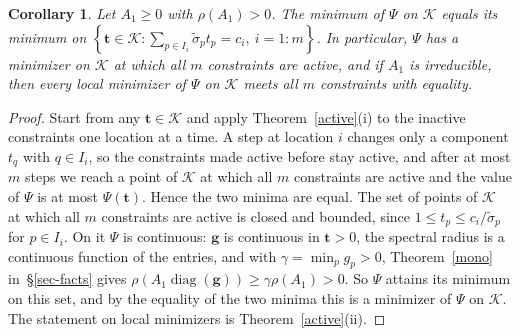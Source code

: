 \documentclass[11pt]{article}
\theoremstyle{plain}
\newtheorem{corollary}[theorem]{Corollary}
\theoremstyle{definition}
\theoremstyle{remark}
\numberwithin{equation}{section}
\numberwithin{figure}{section}
\numberwithin{table}{section}
\numberwithin{algorithm}{section}
\begin{document}
\begin{corollary}\label{all-active}
Let $A_1\ge 0$ with $\rho(A_1)>0$. The minimum of $\Psi$ on $\mathcal{K}$ equals its minimum on
$\left\{\bm t\in\mathcal{K}:\sum_{p\in I_i}\widetilde\sigma_pt_p=c_i,\ i=1:m\right\}$.
In particular, $\Psi$ has a minimizer on $\mathcal{K}$ at which all $m$
constraints are active, and if $A_1$ is irreducible, then every local minimizer of $\Psi$ on
$\mathcal{K}$ meets all $m$ constraints with equality.
\end{corollary}
\begin{proof}
Start from any $\bm t\in\mathcal{K}$ and apply Theorem~\ref{active}(i) to
the inactive constraints one location at a time. A step at location $i$
changes only a component $t_q$ with $q\in I_i$, so the constraints made active
before stay active, and after at most $m$ steps we reach a point of
$\mathcal{K}$ at which all $m$ constraints are active and the value of $\Psi$
is at most $\Psi(\bm t)$. Hence the two minima are equal. The set of points of
$\mathcal{K}$ at which all $m$ constraints are active is closed and bounded,
since $1\le t_p\le c_i/\widetilde\sigma_p$ for $p\in I_i$. On it $\Psi$ is
continuous: $\bm g$ is continuous in $\bm t>0$, the spectral radius is a
continuous function of the entries, and with $\gamma=\min_p g_p>0$,
Theorem~\ref{mono} in~\S\ref{sec-facts} gives
$\rho\left(A_1\operatorname{diag}(\bm g)\right)\ge\gamma\rho(A_1)>0$. So $\Psi$
attains its minimum on this set, and by the equality of the two minima this is a
minimizer of $\Psi$ on $\mathcal{K}$. The statement on local minimizers is
Theorem~\ref{active}(ii).
\end{proof}
\end{document}
